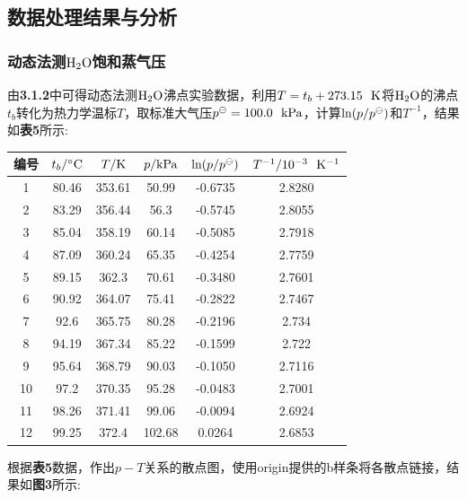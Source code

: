 \documentclass[12pt]{article}
\begin{document}
	\subsection{数据处理结果与分析}
		\subsubsection{动态法测$\rm H_{2}O$饱和蒸气压}
		由\textbf{3.1.2}中可得动态法测$\rm H_{2}O$沸点实验数据，利用$T=t_{b}+273.15\ \ {\rm K}$将$\rm H_{2}O$的沸点$t_{b}$转化为热力学温标$T$，取标准大气压$p^{\ominus}=100.0\ \ {\rm kPa}$，计算${\rm ln}(p/p^{\ominus})$和$T^{-1}$，结果如\textbf{表5}所示:
		\begin{table}[h]
			\centering
			\begin{tabular}{cccccc}
				\toprule
				编号 & $t_{b}/{\rm ^{\circ}C}$& $T/{\rm K}$ & $p/{\rm kPa}$ & ${\rm ln}(p/p^{\ominus})$ & $T^{-1}/{\rm 10^{-3}\ \ K^{-1}}$\\
				\midrule
				1  & 80.46 & 353.61 & 50.99  & -0.6735 & 2.8280 \\
				2  & 83.29 & 356.44 & 56.3   & -0.5745 & 2.8055 \\
				3  & 85.04 & 358.19 & 60.14  & -0.5085 & 2.7918   \\
				4  & 87.09 & 360.24 & 65.35  & -0.4254 & 2.7759  \\
				5  & 89.15 & 362.3  & 70.61  & -0.3480 & 2.7601 \\
				6  & 90.92 & 364.07 & 75.41  & -0.2822& 2.7467 \\
				7  & 92.6  & 365.75 & 80.28  & -0.2196 & 2.734 \\
				8  & 94.19 & 367.34 & 85.22  & -0.1599 & 2.722 \\
				9  & 95.64 & 368.79 & 90.03  & -0.1050& 2.7116  \\
				10 & 97.2  & 370.35 & 95.28  & -0.0483 & 2.7001 \\
				11 & 98.26 & 371.41 & 99.06  & -0.0094& 2.6924\\
				12 & 99.25 & 372.4  & 102.68 & 0.0264  & 2.6853  \\
				\bottomrule
			\end{tabular}
		\end{table}
		\par
		根据\textbf{表5}数据，作出$p-T$关系的散点图，使用origin提供的b样条将各散点链接，结果如\textbf{图3}所示:
\end{document}
